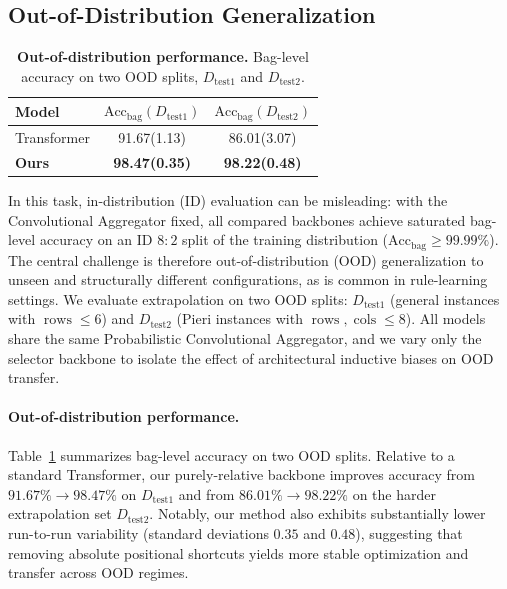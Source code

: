 \documentclass{article}
\theoremstyle{plain}
\theoremstyle{definition}
\theoremstyle{remark}
\newcommand\rows{\operatorname{rows}}
\newcommand\cols{\operatorname{cols}}
\begin{document}
\subsection{Out-of-Distribution Generalization}
\label{sec:ood_results}
\begin{table}[t]
	\centering
\caption{\textbf{Out-of-distribution performance.}
Bag-level accuracy on two OOD splits, $D_{\text{test1}}$ and $D_{\text{test2}}$.}
	\label{tab:headline_main}
	\begin{tabular}{lcc}
		\toprule
		\textbf{Model} &
		$\mathrm{Acc}_{\text{bag}}(D_{\text{test1}})$ &
		$\mathrm{Acc}_{\text{bag}}(D_{\text{test2}})$ \\
		\midrule
		Transformer & 91.67(1.13) & 86.01(3.07) \\
		\textbf{Ours} & \textbf{98.47(0.35)} & \textbf{98.22(0.48)} \\
		\bottomrule
	\end{tabular}
\end{table}
In this task, in-distribution (ID) evaluation can be misleading: with the Convolutional Aggregator fixed, all compared backbones achieve saturated bag-level accuracy on an ID $8{:}2$ split of the training distribution ($\mathrm{Acc}_{\mathrm{bag}}\ge 99.99\%$).
The central challenge is therefore out-of-distribution (OOD) generalization to unseen and structurally different configurations, as is common in rule-learning settings.
We evaluate extrapolation on two OOD splits: $D_{\text{test1}}$ (general instances with $\rows \le 6$) and $D_{\text{test2}}$ (Pieri instances with $\rows,\cols \le 8$).
All models share the same Probabilistic Convolutional Aggregator, and we vary only the selector backbone to isolate the effect of architectural inductive biases on OOD transfer.

\paragraph{Out-of-distribution performance.}
Table~\ref{tab:headline_main} summarizes bag-level accuracy on two OOD splits.
Relative to a standard Transformer, our purely-relative backbone improves accuracy from $91.67\%\to 98.47\%$ on $D_{\text{test1}}$ and from $86.01\%\to 98.22\%$ on the harder extrapolation set $D_{\text{test2}}$.
Notably, our method also exhibits substantially lower run-to-run variability (standard deviations $0.35$ and $0.48$), suggesting that removing absolute positional shortcuts yields more stable optimization and transfer across OOD regimes.
\end{document}
